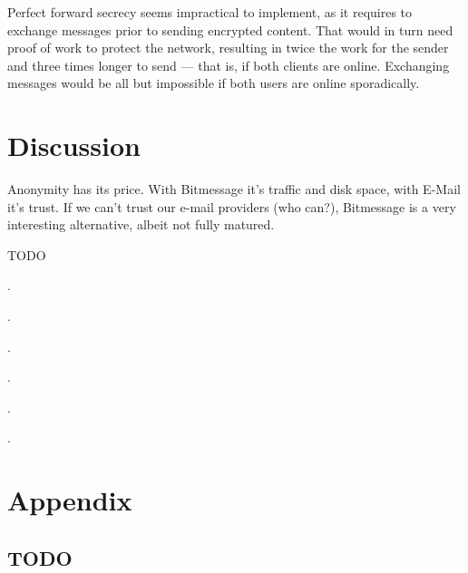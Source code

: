 \documentclass{bfh}
\begin{document}
  Perfect forward secrecy seems impractical to implement, as it requires to exchange messages prior to sending encrypted content. That would in turn need proof of work to protect the network, resulting in twice the work for the sender and three times longer to send --- that is, if both clients are online. Exchanging messages would be all but impossible if both users are online sporadically.

  \newpage
  \section{Discussion}

  Anonymity has its price. With Bitmessage it's traffic and disk space, with E-Mail it's trust. If we can't trust our e-mail providers (who can?), Bitmessage is a very interesting alternative, albeit not fully matured.

  TODO

  .

  .

  .

  .

  .

  .


  
  

  \appendix
  \section*{Appendix}
  \renewcommand{\thesubsection}{\Alph{subsection}}

  \subsection{TODO}
\end{document}
